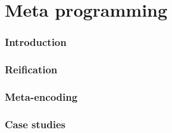 \part{Meta programming}
\section{Introduction}

\section{Reification}

\section{Meta-encoding}

\section{Case studies}
% 
% 
% 
% 

% 
% 
% 
%
